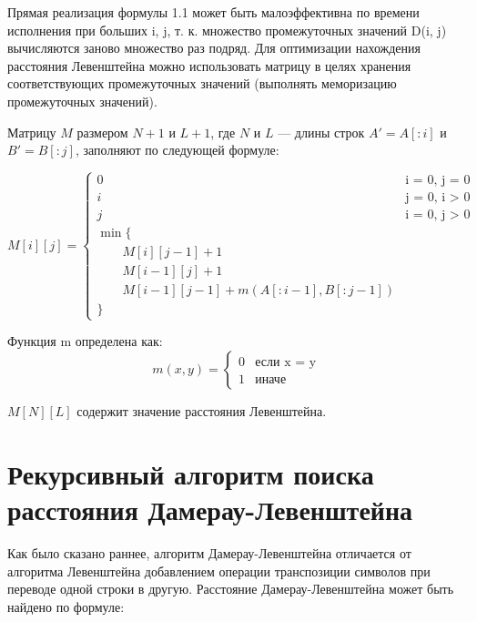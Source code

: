 Прямая реализация формулы 1.1 может быть малоэффективна по времени исполнения при больших i, j, т. к. множество промежуточных значений D(i, j) вычисляются заново множество раз подряд. Для оптимизации нахождения расстояния Левенштейна можно использовать матрицу в целях хранения соответствующих промежуточных значений (выполнять меморизацию промежуточных значений).

Матрицу $M$ размером $N+1$ и $L+1$, где $N$ и $L$ --- длины строк $A'= A[:i]$ и $B' = B[:j]$, заполняют по следующей формуле:

\begin{equation}
	\label{eq:mL}
	M[i][j] = \begin{cases}
		0 &\text{i = 0, j = 0}\\
		i &\text{j = 0, i > 0}\\
		j &\text{i = 0, j > 0}\\
		\min \lbrace \\
		\qquad M[i][j-1] + 1\\
		\qquad M[i-1][j] + 1\\
		\qquad M[i-1][j-1] + m(A[:i-1], B[:j-1]) \\
		\rbrace
	\end{cases}
\end{equation}

Функция m определена как:
\begin{equation}
	\label{eq:mm}
	m(x, y) = \begin{cases}
		0 &\text{если x = y}\\
		1 &\text{иначе}
	\end{cases}
\end{equation}

$M[N][L]$ содержит значение расстояния Левенштейна.

\section{Рекурсивный алгоритм поиска расстояния Дамерау-Левенштейна}

Как было сказано раннее, алгоритм Дамерау-Левенштейна отличается от алгоритма Левенштейна добавлением операции транспозиции символов при переводе одной строки в другую. Расстояние Дамерау-Левенштейна может быть найдено по формуле:

